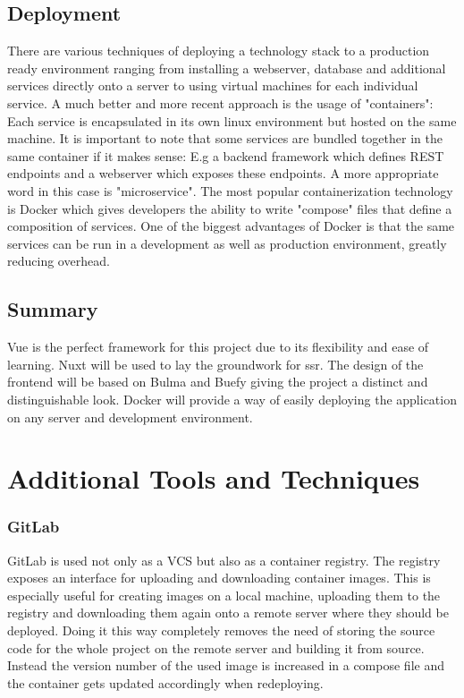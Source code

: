 \subsection{Deployment}
There are various techniques of deploying a technology stack to a production ready environment ranging from installing a webserver, database and additional services directly onto a server to using virtual machines for each individual service. A much better and more recent approach is the usage of "containers": Each service is encapsulated in its own linux environment but hosted on the same machine. It is important to note that some services are bundled together in the same container if it makes sense: E.g a backend framework which defines REST endpoints and a webserver which exposes these endpoints. A more appropriate word in this case is "microservice". The most popular containerization technology is Docker which gives developers the ability to write "compose" files that define a composition of services. One of the biggest advantages of Docker is that the same services can be run in a development as well as production environment, greatly reducing overhead.

\subsection{Summary}
Vue is the perfect framework for this project due to its flexibility and ease of learning. Nuxt will be used to lay the groundwork for \acrshort{ssr}. The design of the frontend will be based on Bulma and Buefy giving the project a distinct and distinguishable look. Docker will provide a way of easily deploying the application on any server and development environment.

\section{Additional Tools and Techniques}
\subsubsection{GitLab}
GitLab is used not only as a VCS but also as a container registry. The registry exposes an interface for uploading and downloading container images. This is especially useful for creating images on a local machine, uploading them to the registry and downloading them again onto a remote server where they should be deployed. Doing it this way completely removes the need of storing the source code for the whole project on the remote server and building it from source. Instead the version number of the used image is increased in a compose file and the container gets updated accordingly when redeploying.

